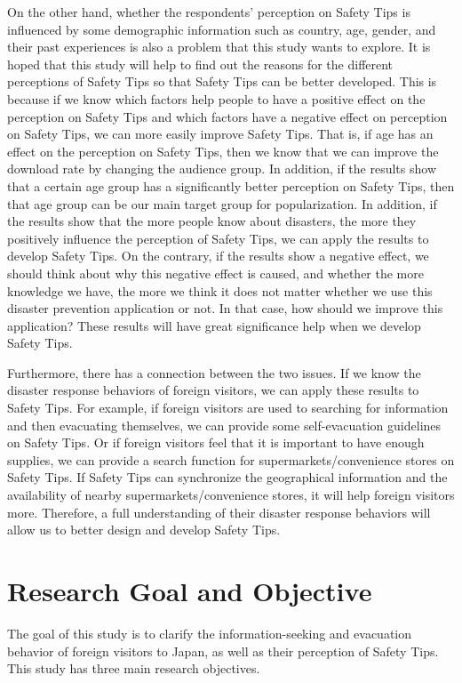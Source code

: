 On the other hand, whether the respondents' perception on Safety Tips is influenced by some demographic information such as country, age, gender, and their past experiences is also a problem that this study wants to explore. It is hoped that this study will help to find out the reasons for the different perceptions of Safety Tips so that Safety Tips can be better developed. This is because if we know which factors help people to have a positive effect on the perception on Safety Tips and which factors have a negative effect on perception on Safety Tips, we can more easily improve Safety Tips. That is, if age has an effect on the perception on Safety Tips, then we know that we can improve the download rate by changing the audience group. In addition, if the results show that a certain age group has a significantly better perception on Safety Tips, then that age group can be our main target group for popularization. In addition, if the results show that the more people know about disasters, the more they positively influence the perception of Safety Tips, we can apply the results to develop Safety Tips. On the contrary, if the results show a negative effect, we should think about why this negative effect is caused, and whether the more knowledge we have, the more we think it does not matter whether we use this disaster prevention application or not. In that case, how should we improve this application? These results will have great significance help when we develop Safety Tips. 

Furthermore, there has a connection between the two issues. If we know the disaster response behaviors of foreign visitors, we can apply these results to Safety Tips. For example, if foreign visitors are used to searching for information and then evacuating themselves, we can provide some self-evacuation guidelines on Safety Tips. Or if foreign visitors feel that it is important to have enough supplies, we can provide a search function for supermarkets/convenience stores on Safety Tips. If Safety Tips can synchronize the geographical information and the availability of nearby supermarkets/convenience stores, it will help foreign visitors more. Therefore, a full understanding of their disaster response behaviors will allow us to better design and develop Safety Tips.

\section{Research Goal and Objective}
The goal of this study is to clarify the information-seeking and evacuation behavior of foreign visitors to Japan, as well as their perception of Safety Tips. This study has three main research objectives. 

